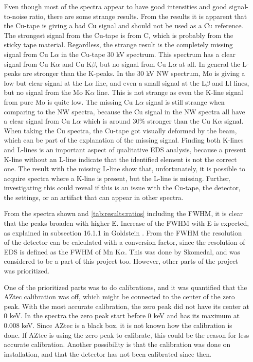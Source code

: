 Even though most of the spectra appear to have good intensities and good signal-to-noise ratio, there are some strange results.
From the results it is apparent that the Cu-tape is giving a bad Cu signal and should not be used as a Cu reference.
The strongest signal from the Cu-tape is from C, which is probably from the sticky tape material.
Regardless, the strange result is the completely missing signal from Cu L$\alpha$ in the Cu-tape 30 kV spectrum.
This spectrum has a clear signal from Cu K$\alpha$ and Cu K$\beta$, but no signal from Cu L$\alpha$ at all.
In general the L-peaks are stronger than the K-peaks.
In the 30 kV NW spectrum, Mo is giving a low but clear signal at the L$\alpha$ line, and even a small signal at the L$\beta$ and Ll lines, but no signal from the Mo K$\alpha$ line.
This is not strange as even the K-line signal from pure Mo is quite low.
The missing Cu L$\alpha$ signal is still strange when comparing to the NW spectra, because the Cu signal in the NW spectra all have a clear signal from Cu L$\alpha$ which is around 30\% stronger than the Cu K$\alpha$ signal.
When taking the Cu spectra, the Cu-tape got visually deformed by the beam, which can be part of the explanation of the missing signal.
Finding both K-lines and L-lines is an important aspect of qualitative EDS analysis, because a present K-line without an L-line indicate that the identified element is not the correct one.
The result with the missing L-line show that, unfortunately, it is possible to acquire spectra where a K-line is present, but the L-line is missing.
Further, investigating this could reveal if this is an issue with the Cu-tape, the detector, the settings, or an artifact that can appear in other spectra.


From the spectra shown and \cref{tab:results:ratios} including the FWHM, it is clear that the peaks broaden with higher E.
Increase of the FWHM with E is expected, as explained in subsection 16.1.1 in Goldstein \cite{goldstein_scanning_2018}.
From the FWHM the resolution of the detector can be calculated with a conversion factor, since the resolution of EDS is defined as the FWHM of Mn K$\alpha$.
This was done by Skomedal, and was considered to be a part of this project too.
However, other parts of the project was prioritized.


One of the prioritized parts was to do calibrations, and it was quantified that the AZtec calibration was off, which might be connected to the center of the zero peak.
With the most accurate calibration, the zero peak did not have its center at 0 keV.
In the spectra the zero peak start before 0 keV and has its maximum at 0.008 keV.
Since AZtec is a black box, it is not known how the calibration is done.
If AZtec is using the zero peak to calibrate, this could be the reason for less accurate calibration.
Another possibility is that the calibration was done on installation, and that the detector has not been calibrated since then.


